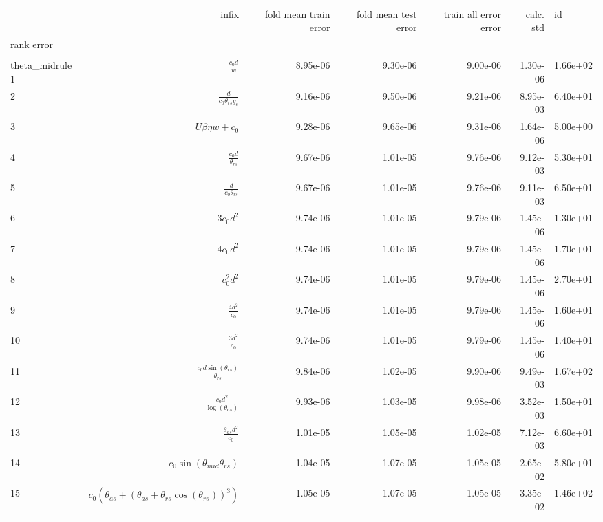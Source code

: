 \begin{tabularx}{\textwidth}{lRRRRRl}
\toprule
  &  infix  &  fold mean train error  &  fold mean test error  &  train all error error  &  calc. std  &  id  \\ 
rank error  &    &    &    &    &    &    \\ 
\\theta_{mid}rule
1  &  $ \displaystyle\frac{c_{0} d}{w} $  &  8.95e-06  &  9.30e-06  &  9.00e-06  &  1.30e-06  &  1.66e+02  \\ 
2  &  $ \displaystyle\frac{d}{c_{0} \theta_{rs} y_c} $  &  9.16e-06  &  9.50e-06  &  9.21e-06  &  8.95e-03  &  6.40e+01  \\ 
3  &  $ U \beta \eta w + c_{0} $  &  9.28e-06  &  9.65e-06  &  9.31e-06  &  1.64e-06  &  5.00e+00  \\ 
4  &  $ \displaystyle\frac{c_{0} d}{\theta_{rs}} $  &  9.67e-06  &  1.01e-05  &  9.76e-06  &  9.12e-03  &  5.30e+01  \\ 
5  &  $ \displaystyle\frac{d}{c_{0} \theta_{rs}} $  &  9.67e-06  &  1.01e-05  &  9.76e-06  &  9.11e-03  &  6.50e+01  \\ 
6  &  $ 3 c_{0} d^{2} $  &  9.74e-06  &  1.01e-05  &  9.79e-06  &  1.45e-06  &  1.30e+01  \\ 
7  &  $ 4 c_{0} d^{2} $  &  9.74e-06  &  1.01e-05  &  9.79e-06  &  1.45e-06  &  1.70e+01  \\ 
8  &  $ c_{0}^{2} d^{2} $  &  9.74e-06  &  1.01e-05  &  9.79e-06  &  1.45e-06  &  2.70e+01  \\ 
9  &  $ \displaystyle\frac{4 d^{2}}{c_{0}} $  &  9.74e-06  &  1.01e-05  &  9.79e-06  &  1.45e-06  &  1.60e+01  \\ 
10  &  $ \displaystyle\frac{3 d^{2}}{c_{0}} $  &  9.74e-06  &  1.01e-05  &  9.79e-06  &  1.45e-06  &  1.40e+01  \\ 
11  &  $ \displaystyle\frac{c_{0} d \sin{\left(\theta_{rs} \right)}}{\theta_{rs}} $  &  9.84e-06  &  1.02e-05  &  9.90e-06  &  9.49e-03  &  1.67e+02  \\ 
12  &  $ \displaystyle\frac{c_{0} d^{2}}{\log{\left(\theta_{as} \right)}} $  &  9.93e-06  &  1.03e-05  &  9.98e-06  &  3.52e-03  &  1.50e+01  \\ 
13  &  $ \displaystyle\frac{\theta_{as} d^{2}}{c_{0}} $  &  1.01e-05  &  1.05e-05  &  1.02e-05  &  7.12e-03  &  6.60e+01  \\ 
14  &  $ c_{0} \sin{\left(\theta_{mid} \theta_{rs} \right)} $  &  1.04e-05  &  1.07e-05  &  1.05e-05  &  2.65e-02  &  5.80e+01  \\ 
15  &  $ c_{0} \left(\theta_{as} + \left(\theta_{as} + \theta_{rs} \cos{\left(\theta_{rs} \right)}\right)^{3}\right) $  &  1.05e-05  &  1.07e-05  &  1.05e-05  &  3.35e-02  &  1.46e+02  \\ 

\end{tabularx}
